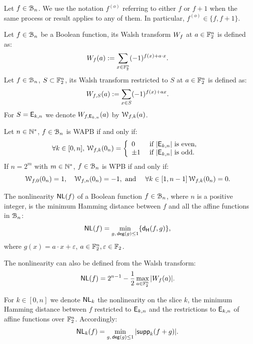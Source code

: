 \documentclass[11pt]{llncs}
\begin{document}
\begin{remark}
    Let $f\in \mathcal{B}_{n}$. We use the notation $f^{(o)}$ referring to either $f$ or $f + 1$ when the same process or result applies to any of them. 
    In particular, $f^{(o)} \in \{f, f + 1\}$.
\end{remark}


\iffalse
\begin{definition}\label{def:walsh_transform}
	Let $f\in \mathcal{B}_{n}$ be a Boolean function, its Walsh transform $W_{f}$ at $a \in \mathbb{F}_2^n$ is defined as:
	\[  W_{f} (a) := \sum_{x \in \mathbb{F}_2^n} (-1)^{f(x) +  a \cdot x }.\]
	Let $f\in \mathcal{B}_{n}$, $S \subset \mathbb{F}_2^n$, its Walsh transform restricted to $S$ at $a \in \mathbb{F}_2^n$ is defined as:
	\[  W_{f,S} (a) := \sum_{x\in S} (-1)^{f(x)+ax}.\]
	For $S=\mathsf{E}_{k,n}$ we denote $W_{f,\mathsf{E}_{k,n}} (a)$ by $\mathcal{W}_{f,k}(a)$.
	
\end{definition}

\begin{Prop}\label{prop:WAPBWalsh}
	
Let $n\in \mathbb{N}^*$, $f\in \mathcal{B}_{n}$ is WAPB if and only if:
\[\forall k \in [0,n], \, \mathcal{W}_{f,k}(0_n)=   
\left \{
\begin{array}{l l}
0  & \text{ if } |\mathsf{E}_{k,n}| \text{ is even, } \\
\pm 1 & \text{ if }  |\mathsf{E}_{k,n}| \text{ is odd.}
\end{array}\right. \] 
If $n=2^m$ with $m\in \mathbb{N}^*$, $f\in \mathcal{B}_{n}$ is WPB if and only if:
\[\mathcal{W}_{f,0}(0_n)=1, \quad \mathcal{W}_{f,n}(0_n)=-1, \text{ and } \quad \forall k \in [1,n-1] \,  \mathcal{W}_{f,k}(0_n)=0. \] 
	
\end{Prop}

\begin{definition} \label{def:nl}
	The nonlinearity $\mathsf{NL}(f)$ of a Boolean function $f\in \mathcal{B}_n$, where $n$ is a positive integer, is the minimum Hamming distance between $f$ and all the affine functions in $\mathcal{B}_n$:
	\[ \mathsf{NL}(f) = \min_{g,\, \mathsf{deg}(g)\leq 1} \{ \mathsf{d_H}(f,g) \}{,} \]
	where $g(x)=a\cdot x+\varepsilon$, $a\in \mathbb{F}_2^n, \varepsilon\in \mathbb{F}_2$. 
	
	The nonlinearity can also be defined from the Walsh transform:
	\[ \mathsf{NL}(f) = 2^{n-1}- \frac{1}{2} \max_{a\in \mathbb{F}_2^n}{|W_{f}(a)|}. \]
	
	
	For $k\in [0,n]$ we denote $\mathsf{NL}_{k}$ the nonlinearity on the slice $k$, the minimum Hamming distance between $f$ restricted to $\mathsf{E}_{k,n}$ and the restrictions to $\mathsf{E}_{k,n}$ of affine functions over $\mathbb{F}_2^n$. 
	Accordingly: 
	\[\mathsf{NL}_{k}(f)=\min_{g,\, \mathsf{deg}(g)\leq 1} |\mathsf{supp}_{k}(f+g)|.\]
\end{definition}
\end{document}
